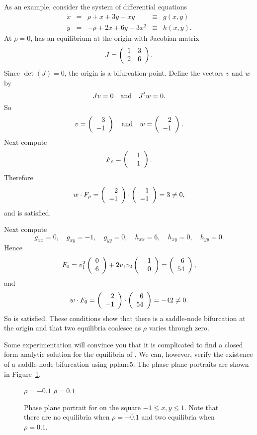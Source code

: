 As an example, consider the system of differential equations
\begin{equation*}  \label{e:snex}
\begin{array}{rcccl}
\dot{x} & = & \rho + x + 3y -xy & \equiv & g(x,y) \\
\dot{y} & = & -\rho + 2x + 6y + 3x^2 & \equiv & h(x,y).  
\end{array}
\end{equation*}
At $\rho = 0$,  has an equilibrium at the origin with 
Jacobian matrix
\[
J = \left(\begin{array}{rr} 1 & 3\\ 2 &6\end{array}\right).
\]
Since $\det(J)=0$, the origin is a bifurcation point.  Define the 
vectors $v$ and $w$ by
\[
Jv=0 \quad\mbox{and}\quad J^tw=0.
\]
So
\[
v = \left(\begin{array}{r} 3 \\ -1\end{array}\right) \quad\mbox{and}\quad  w = \left(\begin{array}{r} 2 \\ -1\end{array}\right).
\]
Next compute
\[
F_\rho = \left(\begin{array}{r} 1 \\ -1\end{array}\right).
\]
Therefore
\[
w \cdot F_\rho = \left(\begin{array}{r} 2 \\ -1\end{array}\right) \cdot \left(\begin{array}{r} 1 \\ -1\end{array}\right) = 3 \neq 0,
\]
and  is satisfied.  

Next compute
\[
g_{xx}=0, \quad g_{xy}=-1, \quad g_{yy}=0, \quad
h_{xx}=6, \quad h_{xy}=0, \quad h_{yy} = 0.
\]
Hence
\[
F_0 = v_1^2 \left(\begin{array}{r} 0 \\ 6\end{array}\right) + 2v_1v_2\left(\begin{array}{r} -1 \\ 0\end{array}\right) = \left(\begin{array}{r} 6 \\ 54\end{array}\right),
\]
and 
\[
w\cdot F_0 = \left(\begin{array}{r} 2 \\ -1\end{array}\right) \cdot \left(\begin{array}{r} 6 \\ 54\end{array}\right) = -42 \neq 0.
\]
So  is satisfied. These conditions show that there is
a saddle-node bifurcation at the origin and that two equilibria 
coalesce as $\rho$ varies through zero. 

Some experimentation will convince you that it is complicated to find 
a closed form analytic solution for the equilibria of .  
We can, however, verify the existence of a saddle-node bifurcation 
using {\sf pplane5}.  The phase plane portraits are shown in 
Figure~\ref{F:snex}.

\begin{figure}[htb]
           \centerline{%
	   }
	\vspace*{-0.2in}
	\hspace{1.0in} $\rho=-0.1$  \hspace{2.55in} $\rho=0.1$ 
           \caption{Phase plane portrait for \protect{} on 
	the square $-1\leq x,y \leq 1$.  Note that there are no 
	equilibria when $\rho=-0.1$ and two equilibria when $\rho=0.1$.}
           \label{F:snex}
\end{figure}


\EXER

\TEXER

